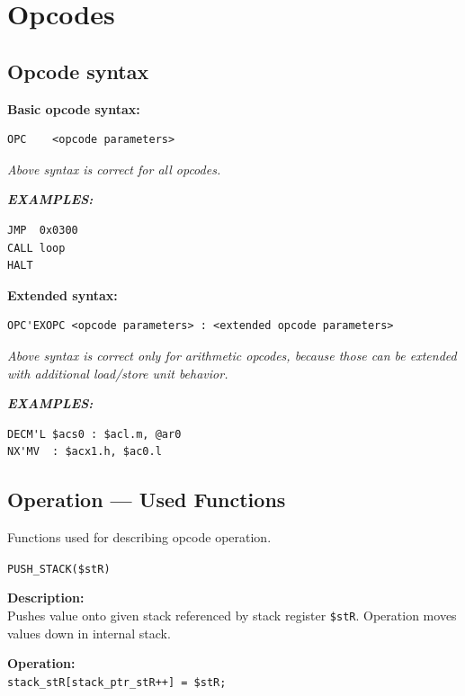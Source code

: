 \documentclass[oneside,english,a4paper,10pt,oneside,openany,final]{memoir}
\newcommand{\Code}[1]{\texttt{#1}}
\newcommand{\Function}[1]{\texttt{#1}}
\newcommand{\Register}[1]{\texttt{#1}}
\begin{document}
\pagebreak{}

\chapter{Opcodes}

\section{Opcode syntax}

\vspace{3mm}
\textbf{Basic opcode syntax:}

\begin{lstlisting}[basicstyle=\ttfamily]
OPC    <opcode parameters>
\end{lstlisting}

\textit{Above syntax is correct for all opcodes.}
\vspace{5mm}

\textbf{\textit{EXAMPLES:}}
\begin{lstlisting}[basicstyle=\ttfamily]
JMP  0x0300
CALL loop
HALT
\end{lstlisting}

\vspace{5mm}

\textbf{Extended syntax:}

\begin{lstlisting}[basicstyle=\ttfamily]
OPC'EXOPC <opcode parameters> : <extended opcode parameters>
\end{lstlisting}

\textit{Above syntax is correct only for arithmetic opcodes, because those can be extended with additional load/store unit behavior.}
\vspace{5mm}

\textbf{\textit{EXAMPLES:}}
\begin{lstlisting}[basicstyle=\ttfamily]
DECM'L $acs0 : $acl.m, @ar0
NX'MV  : $acx1.h, $ac0.l
\end{lstlisting}

\pagebreak{}

\section{Operation --- Used Functions}

Functions used for describing opcode operation.

\begin{description}
  \item \Function{PUSH\_STACK(\$stR)}
  \begin{description}
	\item \textbf{Description:} \\
      Pushes value onto given stack referenced by stack register \Register{\$stR}. Operation moves values down in internal stack.

    \item \textbf{Operation:} \\
      \Code{stack\_stR[stack\_ptr\_stR++] = \$stR;}
  \end{description}
\end{description}
\end{document}
